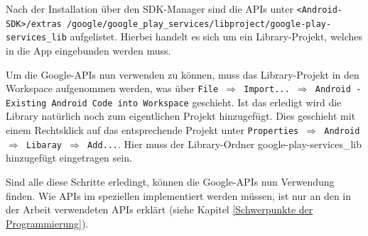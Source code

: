 Nach der Installation \"uber den \ac{SDK}-Manager sind die APIs unter \texttt{<Android-SDK>/extras /google/google\_play\_services/libproject/google-play-services\_lib} aufgelistet. Hierbei handelt es sich um ein Library-Projekt, welches in die App eingebunden werden muss.

Um die Google-APIs nun verwenden zu k\"onnen, muss das Library-Projekt in den Workspace aufgenommen werden, was \"uber \texttt{File $\Rightarrow$ Import... $\Rightarrow$ Android - Existing Android Code into Workspace} geschieht. Ist das erledigt wird die Library nat\"urlich noch zum eigentlichen Projekt hinzugef\"ugt. Dies geschieht mit einem Rechtsklick auf das entsprechende Projekt unter \texttt{Properties $\Rightarrow$ Android $\Rightarrow$ Libaray $\Rightarrow$ Add...}. Hier muss der Library-Ordner google-play-services\_lib hinzugef\"ugt eingetragen sein.

Sind alle diese Schritte erledingt, k\"onnen die Google-APIs nun Verwendung finden. Wie APIs im speziellen implementiert werden m\"ussen, ist nur an den in der Arbeit verwendeten APIs erkl\"art (siehe Kapitel \ref{Schwerpunkte der Programmierung}). \cite{ApiAccess} \cite{GolemHBGoogleServices}